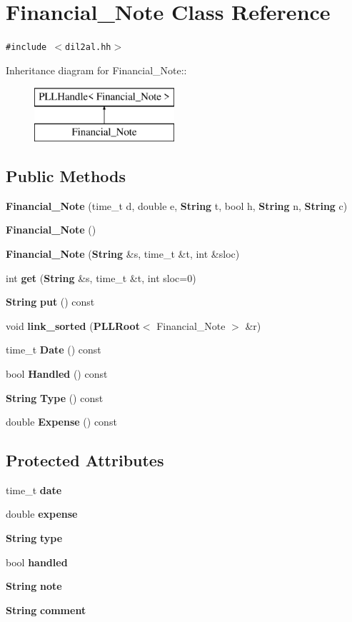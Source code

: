 \section{Financial\_\-Note  Class Reference}
\label{classFinancial__Note}
{\tt \#include $<$dil2al.hh$>$}

Inheritance diagram for Financial\_\-Note::\begin{figure}[H]
\begin{center}
\leavevmode
\includegraphics[height=2cm]{classFinancial__Note}
\end{center}
\end{figure}
\subsection*{Public Methods}
\begin{CompactItemize}
\item 
{\bf Financial\_\-Note} (time\_\-t d, double e, {\bf String} t, bool h, {\bf String} n, {\bf String} c)
\item 
{\bf Financial\_\-Note} ()
\item 
{\bf Financial\_\-Note} ({\bf String} \&s, time\_\-t \&t, int \&sloc)
\item 
int {\bf get} ({\bf String} \&s, time\_\-t \&t, int sloc=0)
\item 
{\bf String} {\bf put} () const
\item 
void {\bf link\_\-sorted} ({\bf PLLRoot}$<$ Financial\_\-Note $>$ \&r)
\item 
time\_\-t {\bf Date} () const
\item 
bool {\bf Handled} () const
\item 
{\bf String} {\bf Type} () const
\item 
double {\bf Expense} () const
\end{CompactItemize}
\subsection*{Protected Attributes}
\begin{CompactItemize}
\item 
time\_\-t {\bf date}
\item 
double {\bf expense}
\item 
{\bf String} {\bf type}
\item 
bool {\bf handled}
\item 
{\bf String} {\bf note}
\item 
{\bf String} {\bf comment}
\end{CompactItemize}


